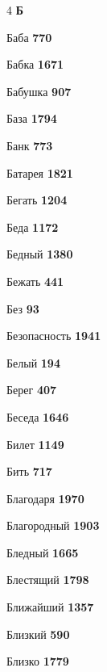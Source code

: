 \begin{multicols}{4}
\vspace{0.6em}\noindent\textbf{\normalsize\sffamily\color{primary} Б}\par\vspace{0.2em}
\noindent Баба \dotfill \textbf{\color{secondary} 770}\par
\noindent Бабка \dotfill \textbf{\color{secondary} 1671}\par
\noindent Бабушка \dotfill \textbf{\color{secondary} 907}\par
\noindent База \dotfill \textbf{\color{secondary} 1794}\par
\noindent Банк \dotfill \textbf{\color{secondary} 773}\par
\noindent Батарея \dotfill \textbf{\color{secondary} 1821}\par
\noindent Бегать \dotfill \textbf{\color{secondary} 1204}\par
\noindent Беда \dotfill \textbf{\color{secondary} 1172}\par
\noindent Бедный \dotfill \textbf{\color{secondary} 1380}\par
\noindent Бежать \dotfill \textbf{\color{secondary} 441}\par
\noindent Без \dotfill \textbf{\color{secondary} 93}\par
\noindent Безопасность \dotfill \textbf{\color{secondary} 1941}\par
\noindent Белый \dotfill \textbf{\color{secondary} 194}\par
\noindent Берег \dotfill \textbf{\color{secondary} 407}\par
\noindent Беседа \dotfill \textbf{\color{secondary} 1646}\par
\noindent Билет \dotfill \textbf{\color{secondary} 1149}\par
\noindent Бить \dotfill \textbf{\color{secondary} 717}\par
\noindent Благодаря \dotfill \textbf{\color{secondary} 1970}\par
\noindent Благородный \dotfill \textbf{\color{secondary} 1903}\par
\noindent Бледный \dotfill \textbf{\color{secondary} 1665}\par
\noindent Блестящий \dotfill \textbf{\color{secondary} 1798}\par
\noindent Ближайший \dotfill \textbf{\color{secondary} 1357}\par
\noindent Близкий \dotfill \textbf{\color{secondary} 590}\par
\noindent Близко \dotfill \textbf{\color{secondary} 1779}\par

\end{multicols}
